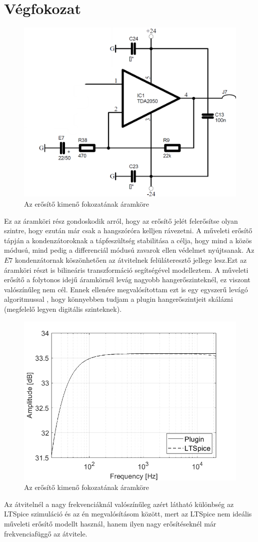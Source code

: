 \section{Végfokozat}
\begin{figure}[H]
    \centering
    \includegraphics[scale=0.35]{figures/stage8.png}
    \caption{Az erősítő kimenő fokozatának áramköre}
\end{figure}
Ez az áramköri rész gondoskodik arról, hogy az erősítő jelét felerősítse olyan szintre, hogy ezután már csak a hangszóróra kelljen rávezetni. A műveleti erősítő tápján a kondenzátoroknak a tápfeszültség stabilitása a célja, hogy mind a közös módusú, mind pedig a differenciál módusú zavarok ellen védelmet nyújtsanak. Az $E7$ kondenzátornak köszönhetően az átvitelnek felüláteresztő jellege lesz.Ezt az áramköri részt is bilineáris transzformáció segítségével modelleztem. A műveleti erősítő a folytonos idejű áramkörnél levág nagyobb hangerőszinteknél, ez viszont valószínűleg nem cél. Ennek ellenére megvalósítottam ezt is egy egyszerű levágó algoritmussal \cite{opampo}, hogy könnyebben tudjam a plugin hangerőszintjeit skálázni (megfelelő legyen digitális szinteknek).
\begin{figure}[H]
    \centering
    \includegraphics[scale=0.5]{figures/stage8ac.png}
    \caption{Az erősítő kimenő fokozatának áramköre}
\end{figure}
Az átvitelnél a nagy frekvenciáknál valószínűleg azért látható különbség az LTSpice szimuláció és az én megvalósításom között, mert az LTSpice nem ideális műveleti erősítő modellt használ, hanem ilyen nagy erősítéseknél már frekvenciafüggő az átvitele. 

